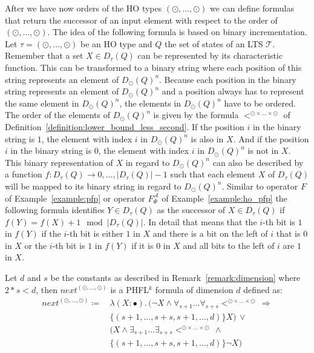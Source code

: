 After we have now orders of the HO types $(\odot, \dots, \odot)$ we can define formulas that return the successor of
an input element with respect to the order of $(\odot, \dots, \odot)$. The idea of the following formula is based on
binary incrementation. Let $\tau = (\odot, \dots, \odot)$ be an HO type and $Q$ the set of states of an LTS
$\mathcal{T}$. Remember that a set $X \in D_\tau(Q)$ can be represented by its characteristic
function. This can be transformed to a binary string where each position of this string represents an element of
$D_{\odot}(Q)^n$. Because each position in the binary string represents an element of $D_{\odot}
(Q)^n$ and a position always has to represent the same element in $D_{\odot}(Q)^n$, the elements
in $D_{\odot}(Q)^n$ have to be ordered. The order of the elements of $D_{\odot}(Q)^n$ is given by
the formula $<^{\odot \times \dots \times \odot}$ of Definition~\ref{definition:lower_bound_less_second}. If the position
$i$ in the binary string is $1$, the element with index $i$ in $D_{\odot}(Q)^n$ is
also in $X$. And if the position $i$ in the binary string is $0$, the element with index $i$ in $D_{\odot}
(Q)^n$ is not in $X$. This binary representation of $X$ in regard to $D_{\odot}
(Q)^n$ can also be described by a function $f \colon D_\tau(Q) \rightarrow 
{0, \dots, |D_\tau(Q)| - 1}$ such that
each element $X$ of $D_\tau(Q)$ will be mapped to its binary string in regard to 
$D_{\odot}(Q)^n$. Similar to operator $F$ of Example~\ref{example:pfp} or operator 
$F_\Phi^\mathcal{A}$ of Example~\ref{example:ho_pfp} the following formula identifies $Y \in 
D_\tau(Q)$ as the successor of $X \in D_\tau(Q)$ if $f(Y) = f(X) + 1 
\mod |D_\tau(Q)|$. In detail that means that the $i$-th bit is $1$ in $f(Y)$ if 
the $i$-th bit is either $1$ in $X$ and there is a bit on the left of $i$ that is $0$ in 
$X$ or the $i$-th bit is $1$ in $f(Y)$ if it is $0$ in $X$ and all bits to the left of $i$ are $1$ in $X
$. 

\begin{definition}
    \label{definition:lower_bounds_next_second}
    Let $d$ and $s$ be the constants as described in Remark~\ref{remark:dimension} where $2*s < d$, then $next^{(\odot, \dots, \odot)}$
    is a PHFL$^k$ formula of dimension $d$ defined as:
    \begin{align*}
        next^{(\odot, \dots, \odot)} \coloneqq &\,\lambda (X \colon \bullet).\, (\neg X \wedge \forall_{s +
        1}\dots\forall_{s + s}<^{\odot \times \dots \times \odot}\, \Rightarrow \\&\,\{(s +
        1, \dots, s + s, s + 1, \dots, d)\} X) \,\vee \\&\,(X \wedge \exists_{s + 1}\dots\exists_{s + s} <^{\odot
        \times \dots \times \odot} \,\wedge \\&\,\{(s + 1, \dots, s + s, s + 1, \dots, d)\}
        \neg X)
    \end{align*}
\end{definition}

